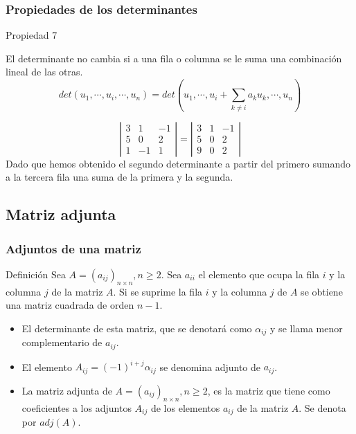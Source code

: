 \documentclass[12pt]{article}
\begin{document}
  
    
     \begin{frame}
  \frametitle{Propiedades de los determinantes}
   \begin{block}{Propiedad 7}
   
El determinante no cambia si a una fila o columna se le suma una combinaci\'on lineal de las otras.
   \[det(u_1, \cdots,u_i, \cdots, u_n) = det(u_1, \cdots,u_i + \sum_{k\neq i} a_k u_k, \cdots, u_n) \]
   
\end{block}

\[ \left|\begin{array}{ccc}3 & 1 & -1 \\5 & 0 & 2 \\1 & -1 & 1\end{array}\right| =  
	\left|\begin{array}{ccc}3 & 1 & -1 \\5 & 0 & 2 \\9 & 0 & 2\end{array}\right| \]
Dado que hemos obtenido el segundo determinante a partir del primero sumando a la tercera fila una suma de la primera y la segunda.
   \end{frame} 
  
        \subsection{Matriz adjunta}
 \begin{frame}
  \frametitle{Adjuntos de una matriz}
   \begin{block}{Definici\'on}
   Sea $A=(a_{ij})_{n\times n}, n\geq 2$. Sea $a_{ii}$ el elemento que ocupa la fila $i$ y la columna $j$ de la matriz $A$. Si se suprime la fila $i$ y la columna $j$ de $A$ se obtiene una matriz cuadrada de orden $n-1$.
   \begin{itemize}
   \item El determinante de esta matriz, que se denotar\'a como $\alpha_{ij}$ y se llama menor complementario de $a_{ij}$.
    \item El elemento $A_{ij} = (-1)^{i+j}\alpha_{ij}$ se denomina adjunto de $a_{ij}$.
    \item La matriz adjunta de $A=(a_{ij})_{n\times n}, n\geq 2$, es la matriz que tiene como coeficientes a los adjuntos $A_{ij}$ de los elementos $a_{ij}$ de la matriz $A$. Se denota por $adj(A)$.
   \end{itemize}
   \end{block}
   \end{frame} 
   
\end{document}
